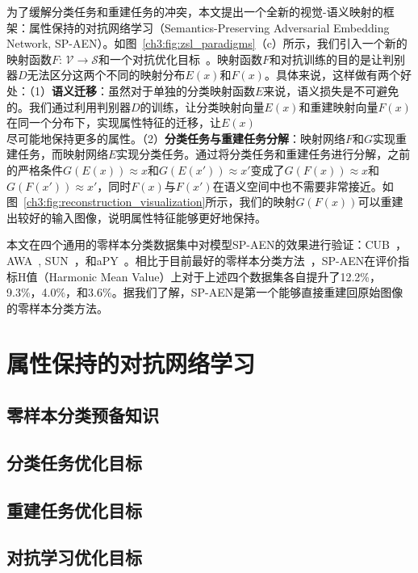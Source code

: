 为了缓解分类任务和重建任务的冲突，本文提出一个全新的视觉-语义映射的框架：属性保持的对抗网络学习（Semantics-Preserving Adversarial Embedding Network, SP-AEN）。如图~\ref{ch3:fig:zsl_paradigms}（c）所示，我们引入一个新的映射函数$F$: $\mathcal{V}\rightarrow \mathcal{S}$和一个对抗优化目标~\cite{goodfellow2014generative}。映射函数$F$和对抗训练的目的是让判别器$D$无法区分这两个不同的映射分布$E(x)$和$F(x)$。具体来说，这样做有两个好处：（1）\textbf{语义迁移}：虽然对于单独的分类映射函数$E$来说，语义损失是不可避免的。我们通过利用判别器$D$的训练，让分类映射向量$E(x)$和重建映射向量$F(x)$在同一个分布下，实现属性特征的迁移，让$E(x)$尽可能地保持更多的属性。（2）\textbf{分类任务与重建任务分解}：映射网络$F$和$G$实现重建任务，而映射网络$E$实现分类任务。通过将分类任务和重建任务进行分解，之前的严格条件$G(E(x)) \approx x$和$G(E(x')) \approx x'$变成了$G(F(x))\approx x$和$G(F(x'))\approx x'$，同时$F(x)$与$F(x')$在语义空间中也不需要非常接近。如图~\ref{ch3:fig:reconstruction_visualization}所示，我们的映射$G(F(x))$可以重建出较好的输入图像，说明属性特征能够更好地保持。

本文在四个通用的零样本分类数据集中对模型SP-AEN的效果进行验证：CUB~\cite{wah2011caltech}，AWA~\cite{lampert2009learning}, SUN~\cite{patterson2012sun}，和aPY~\cite{farhadi2009describing}。相比于目前最好的零样本分类方法~\cite{xian2017zero}，SP-AEN在评价指标H值（Harmonic Mean Value）上对于上述四个数据集各自提升了12.2\%，9.3\%，4.0\%，和3.6\%。据我们了解，SP-AEN是第一个能够直接重建回原始图像的零样本分类方法。


\section{属性保持的对抗网络学习}

\subsection{零样本分类预备知识}


\subsection{分类任务优化目标}


\subsection{重建任务优化目标}


\subsection{对抗学习优化目标}


